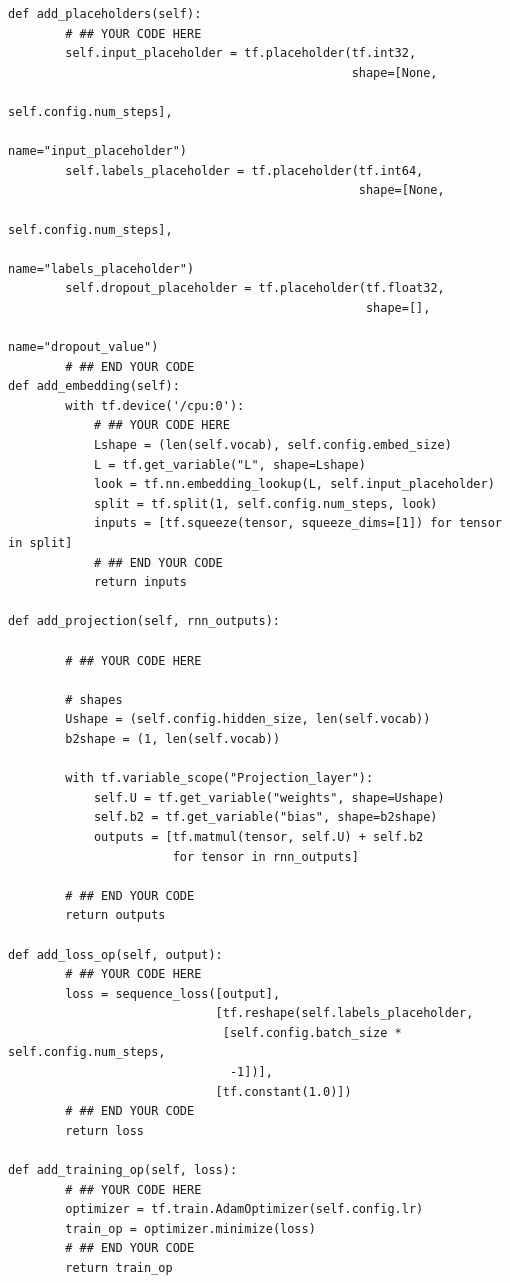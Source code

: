 \documentclass{article}
\begin{document}
\begin{verbatim}
def add_placeholders(self):
        # ## YOUR CODE HERE
        self.input_placeholder = tf.placeholder(tf.int32,
                                                shape=[None,
                                                       self.config.num_steps],
                                                name="input_placeholder")
        self.labels_placeholder = tf.placeholder(tf.int64,
                                                 shape=[None,
                                                        self.config.num_steps],
                                                 name="labels_placeholder")
        self.dropout_placeholder = tf.placeholder(tf.float32,
                                                  shape=[],
                                                  name="dropout_value")
        # ## END YOUR CODE
def add_embedding(self):
        with tf.device('/cpu:0'):
            # ## YOUR CODE HERE
            Lshape = (len(self.vocab), self.config.embed_size)
            L = tf.get_variable("L", shape=Lshape)
            look = tf.nn.embedding_lookup(L, self.input_placeholder)
            split = tf.split(1, self.config.num_steps, look)
            inputs = [tf.squeeze(tensor, squeeze_dims=[1]) for tensor in split]
            # ## END YOUR CODE
            return inputs    

def add_projection(self, rnn_outputs):
       
        # ## YOUR CODE HERE

        # shapes
        Ushape = (self.config.hidden_size, len(self.vocab))
        b2shape = (1, len(self.vocab))

        with tf.variable_scope("Projection_layer"):
            self.U = tf.get_variable("weights", shape=Ushape)
            self.b2 = tf.get_variable("bias", shape=b2shape)
            outputs = [tf.matmul(tensor, self.U) + self.b2
                       for tensor in rnn_outputs]

        # ## END YOUR CODE
        return outputs

def add_loss_op(self, output):
        # ## YOUR CODE HERE
        loss = sequence_loss([output],
                             [tf.reshape(self.labels_placeholder,
                              [self.config.batch_size * self.config.num_steps,
                               -1])],
                             [tf.constant(1.0)])
        # ## END YOUR CODE
        return loss

def add_training_op(self, loss):
        # ## YOUR CODE HERE
        optimizer = tf.train.AdamOptimizer(self.config.lr)
        train_op = optimizer.minimize(loss)
        # ## END YOUR CODE
        return train_op
        

\end{verbatim}
\end{document}
